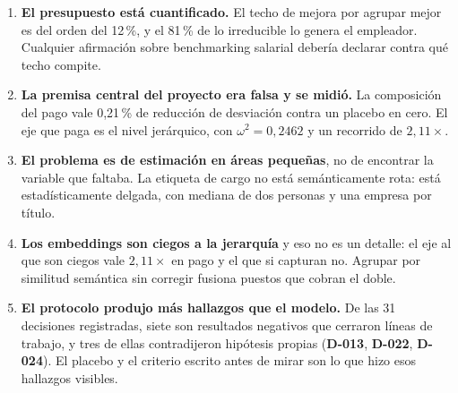 \documentclass[12pt,a4paper]{report}
\newcommand{\dref}[1]{\textbf{D-#1}}
\begin{document}
\begin{enumerate}
  \item \textbf{El presupuesto está cuantificado.} El techo de mejora por
        agrupar mejor es del orden del 12\,\%, y el 81\,\% de lo irreducible lo
        genera el empleador. Cualquier afirmación sobre benchmarking salarial
        debería declarar contra qué techo compite.

  \item \textbf{La premisa central del proyecto era falsa y se midió.} La
        composición del pago vale 0,21\,\% de reducción de desviación contra un
        placebo en cero. El eje que paga es el nivel jerárquico, con
        $\omega^2 = 0{,}2462$ y un recorrido de $2{,}11\times$.

  \item \textbf{El problema es de estimación en áreas pequeñas}, no de encontrar
        la variable que faltaba. La etiqueta de cargo no está semánticamente
        rota: está estadísticamente delgada, con mediana de dos personas y una
        empresa por título.

  \item \textbf{Los embeddings son ciegos a la jerarquía} y eso no es un detalle:
        el eje al que son ciegos vale $2{,}11\times$ en pago y el que si capturan
        no. Agrupar por similitud semántica sin corregir fusiona puestos que
        cobran el doble.

  \item \textbf{El protocolo produjo más hallazgos que el modelo.} De las 31
        decisiones registradas, siete son resultados negativos que cerraron
        líneas de trabajo, y tres de ellas contradijeron hipótesis propias
        (\dref{013}, \dref{022}, \dref{024}). El placebo y el criterio escrito
        antes de mirar son lo que hizo esos hallazgos visibles.
\end{enumerate}
\end{document}
